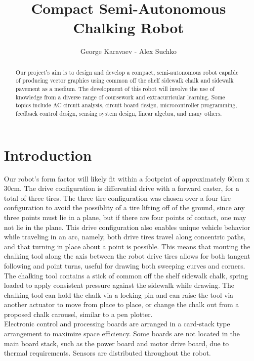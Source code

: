 \documentclass{article}
\begin{document}
 
\title{Compact Semi-Autonomous Chalking Robot}
\author{George Karavaev - Alex Suchko}
\maketitle

\begin{abstract}
Our project's aim is to design and  develop a compact, semi-autonomous robot capable of producing vector graphics using common off the shelf sidewalk chalk and sidewalk pavement as a medium. The development of this robot will involve the use of knowledge from a diverse range of coursework and extracurricular learning. Some topics include AC circuit analysis, circuit board design, microcontroller programming, feedback control design, sensing system design, linear algebra, and many others.
\end{abstract}
\newpage
\tableofcontents
\newpage
\section{Introduction}
Our robot's form factor will likely fit within a footprint of approximately 60cm x 30cm. The drive configuration is differential drive with a forward caster, for a total of three tires. The three tire configuration was chosen over a four tire configuration to avoid the possiblity of a tire lifting off of the ground, since any three points must lie in a plane, but if there are four points of contact, one may not lie in the plane. This drive configuration also enables unique vehicle behavior while traveling in an arc, namely, both drive tires travel along concentric paths, and that turning in place  about a point is possible. This means that mouting the chalking tool along the axis between the robot drive tires allows for both tangent following and point turns, useful for drawing both sweeping curves and corners. The chalking tool contains a stick of common off the shelf sidewalk chalk, spring loaded to apply consistent pressure against the sidewalk while drawing. The chalking tool can hold the chalk via a locking pin and can raise the tool via another actuator to move from place to place, or change the chalk out from a proposed chalk carousel, similar to a pen plotter.\\

Electronic control and processing boards are arranged in a card-stack type arrangement to maximize space efficiency. Some boards are not located in the main board stack, such as the power board and motor drive board, due to thermal requirements. Sensors are distributed throughout the robot.\\
\end{document}
